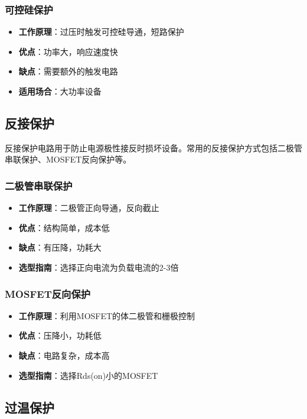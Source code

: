 \documentclass[12pt,UTF8]{ctexbook}
\begin{document}
\subsubsection{可控硅保护}
\begin{itemize}
    \item \textbf{工作原理}：过压时触发可控硅导通，短路保护
    \item \textbf{优点}：功率大，响应速度快
    \item \textbf{缺点}：需要额外的触发电路
    \item \textbf{适用场合}：大功率设备
\end{itemize}

\subsection{反接保护}

反接保护电路用于防止电源极性接反时损坏设备。常用的反接保护方式包括二极管串联保护、MOSFET反向保护等。

\subsubsection{二极管串联保护}
\begin{itemize}
    \item \textbf{工作原理}：二极管正向导通，反向截止
    \item \textbf{优点}：结构简单，成本低
    \item \textbf{缺点}：有压降，功耗大
    \item \textbf{选型指南}：选择正向电流为负载电流的2-3倍
\end{itemize}

\subsubsection{MOSFET反向保护}
\begin{itemize}
    \item \textbf{工作原理}：利用MOSFET的体二极管和栅极控制
    \item \textbf{优点}：压降小，功耗低
    \item \textbf{缺点}：电路复杂，成本高
    \item \textbf{选型指南}：选择Rds(on)小的MOSFET
\end{itemize}

\subsection{过温保护}
\end{document}
